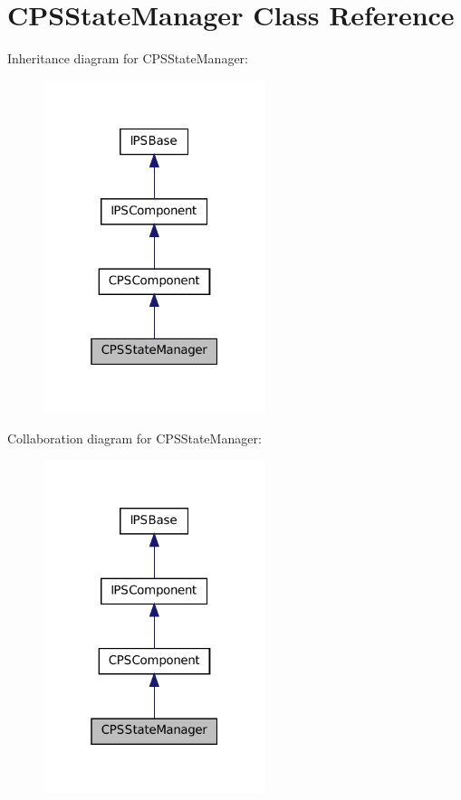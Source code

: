 \hypertarget{classCPSStateManager}{
\section{CPSStateManager Class Reference}
\label{classCPSStateManager}
}


Inheritance diagram for CPSStateManager:\nopagebreak
\begin{figure}[H]
\begin{center}
\leavevmode
\includegraphics[width=184pt]{classCPSStateManager__inherit__graph}
\end{center}
\end{figure}


Collaboration diagram for CPSStateManager:\nopagebreak
\begin{figure}[H]
\begin{center}
\leavevmode
\includegraphics[width=184pt]{classCPSStateManager__coll__graph}
\end{center}
\end{figure}

